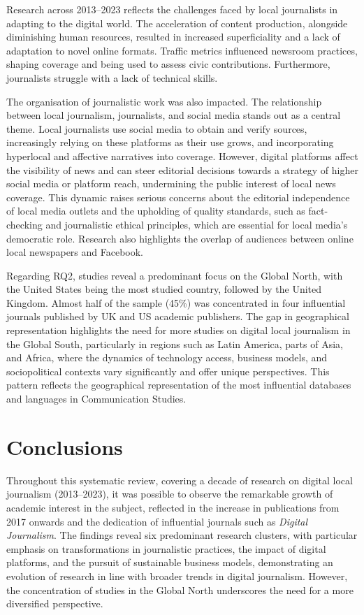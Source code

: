 \documentclass[english]{textolivre}
\begin{document}
 Research across 2013–2023 reflects the challenges faced by local journalists in adapting to the digital world. The acceleration of content production, alongside diminishing human resources, resulted in increased superficiality and a lack of adaptation to novel online formats. Traffic metrics influenced newsroom practices, shaping coverage and being used to assess civic contributions. Furthermore, journalists struggle with a lack of technical skills.

 The organisation of journalistic work was also impacted. The relationship between local journalism, journalists, and social media stands out as a central theme. Local journalists use social media to obtain and verify sources, increasingly relying on these platforms as their use grows, and incorporating hyperlocal and affective narratives into coverage. However, digital platforms affect the visibility of news and can steer editorial decisions towards a strategy of higher social media or platform reach, undermining the public interest of local news coverage. This dynamic raises serious concerns about the editorial independence of local media outlets and the upholding of quality standards, such as fact-checking and journalistic ethical principles, which are essential for local media’s democratic role. Research also highlights the overlap of audiences between online local newspapers and Facebook.

Regarding RQ2, studies reveal a predominant focus on the Global North, with the United States being the most studied country, followed by the United Kingdom. Almost half of the sample (45\%) was concentrated in four influential journals published by UK and US academic publishers. The gap in geographical representation highlights the need for more studies on digital local journalism in the Global South, particularly in regions such as Latin America, parts of Asia, and Africa, where the dynamics of technology access, business models, and sociopolitical contexts vary significantly and offer unique perspectives. This pattern reflects the geographical representation of the most influential databases and languages in Communication Studies.

\section{Conclusions}
Throughout this systematic review, covering a decade of research on digital local journalism (2013–2023), it was possible to observe the remarkable growth of academic interest in the subject, reflected in the increase in publications from 2017 onwards and the dedication of influential journals such as \emph{Digital Journalism}. The findings reveal six predominant research clusters, with particular emphasis on transformations in journalistic practices, the impact of digital platforms, and the pursuit of sustainable business models, demonstrating an evolution of research in line with broader trends in digital journalism. However, the concentration of studies in the Global North underscores the need for a more diversified perspective.
\end{document}
